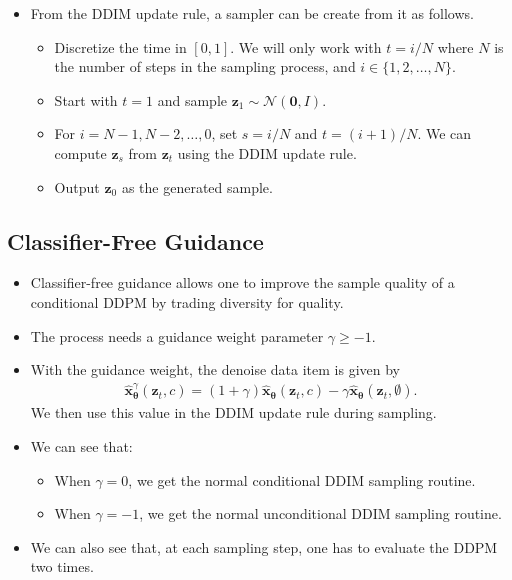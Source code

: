 \documentclass[10pt]{article}
\newcommand{\ve}[1]{\mathbf{#1}}
\newcommand{\ves}[1]{\boldsymbol{#1}}
\newcommand{\mcal}[1]{\mathcal{#1}}
\begin{document}
\begin{itemize}
  \item From the DDIM update rule, a sampler can be create from it as follows.
  \begin{itemize}
    \item Discretize the time in $[0,1]$. We will only work with $t = i/N$ where $N$ is the number of steps in the sampling process, and $i \in \{ 1, 2, \dotsc, N \}$.
    \item Start with $t = 1$ and sample $\ve{z}_1 \sim \mcal{N}(\ve{0},I)$.
    \item For $i = N-1, N-2, \dotsc, 0$, set $s = i/N$ and $t = (i+1)/N$. We can compute $\ve{z}_s$ from $\ve{z}_t$ using the DDIM update rule.
    \item Output $\ve{z}_0$ as the generated sample.
  \end{itemize}
\end{itemize}

\subsection{Classifier-Free Guidance}

\begin{itemize}
  \item Classifier-free guidance allows one to improve the sample quality of a conditional DDPM by trading diversity for quality.
  
  \item The process needs a guidance weight parameter $\gamma \geq -1$.
  
  \item With the guidance weight, the denoise data item is given by
  \begin{align*}
    \hat{\ve{x}}_{\ves{\theta}}^\gamma(\ve{z}_t, c) = (1 + \gamma) \hat{\ve{x}}_{\ves{\theta}}(\ve{z}_t, c) - \gamma \hat{\ve{x}}_{\ves{\theta}}(\ve{z}_t, \emptyset).
  \end{align*}
  We then use this value in the DDIM update rule during sampling.
  
  \item We can see that:
  \begin{itemize}
    \item When $\gamma = 0$, we get the normal conditional DDIM sampling routine.
    \item When $\gamma = -1$, we get the normal unconditional DDIM sampling routine.
  \end{itemize}

  \item We can also see that, at each sampling step, one has to evaluate the DDPM two times.
\end{itemize}
\end{document}
